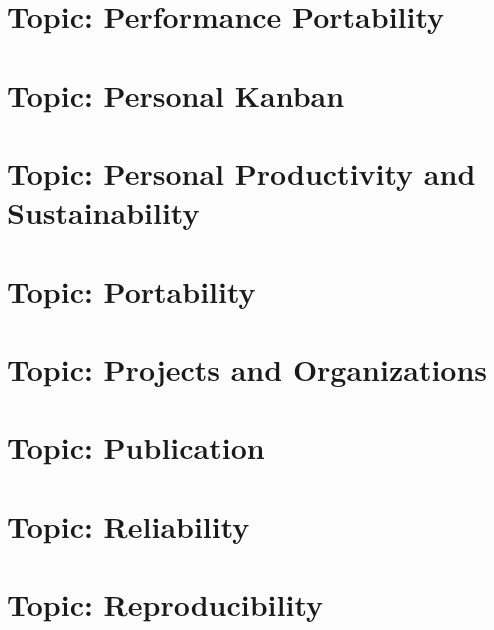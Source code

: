 \documentclass[twoside]{book}
\newcommand{\+}{\discretionary{\mbox{\scriptsize$\hookleftarrow$}}{}{}}
\begin{document}
\chapter{Topic\+: Performance Portability}
\label{md_markdown_topic_performance_portability}

\chapter{Topic\+: Personal Kanban}
\label{md_markdown_topic_personal_kanban}

\chapter{Topic\+: Personal Productivity and Sustainability}
\label{md_markdown_topic_personal_productivity_and_sustainability}

\chapter{Topic\+: Portability}
\label{md_markdown_topic_portability}

\chapter{Topic\+: Projects and Organizations}
\label{md_markdown_topic_projects_and_organizations}

\chapter{Topic\+: Publication}
\label{md_markdown_topic_publication}

\chapter{Topic\+: Reliability}
\label{md_markdown_topic_reliability}

\chapter{Topic\+: Reproducibility}
\label{md_markdown_topic_reproducibility}

\end{document}
